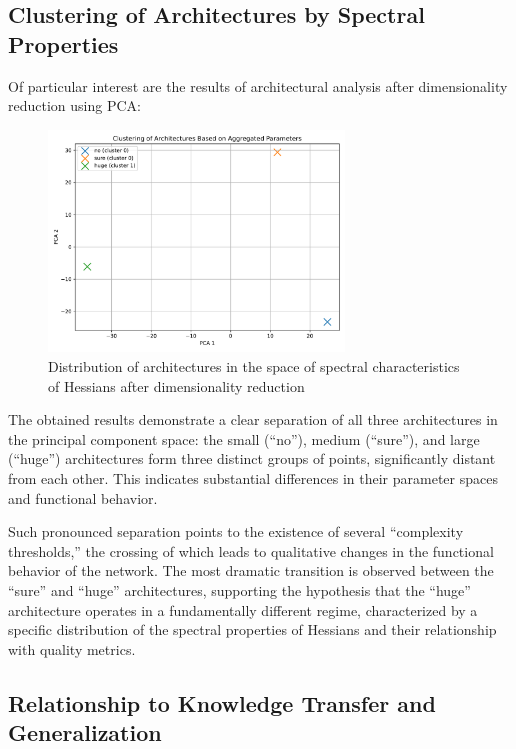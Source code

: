 \documentclass[a4paper,12pt]{article}
\begin{document}
\newpage

\subsection{Clustering of Architectures by Spectral Properties}

Of particular interest are the results of architectural analysis after dimensionality reduction using PCA:

\begin{figure}[ht]
  \centering
  \includegraphics[width=0.7\textwidth]{resources_en/architecture_clustering.pdf}
  \caption{Distribution of architectures in the space of spectral characteristics of Hessians after
  dimensionality reduction}
  \label{fig:architecture_clustering}
\end{figure}

The obtained results demonstrate a clear separation of all three architectures in the principal component
space: the small (``no''), medium (``sure''), and large (``huge'') architectures form three distinct groups
of points, significantly distant from each other. This indicates substantial differences in their parameter
spaces and functional behavior.

Such pronounced separation points to the existence of several ``complexity thresholds,'' the crossing of
which leads to qualitative changes in the functional behavior of the network. The most dramatic transition is
observed between the ``sure'' and ``huge'' architectures, supporting the hypothesis that the ``huge''
architecture operates in a fundamentally different regime, characterized by a specific distribution of the
spectral properties of Hessians and their relationship with quality metrics.

\subsection{Relationship to Knowledge Transfer and Generalization}
\end{document}
